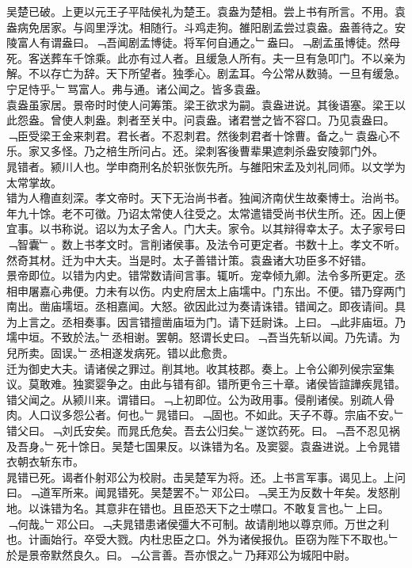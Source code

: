 \documentclass{zhvt-classic}
\begin{document}
\hspace*{2em}吴楚已破。上更以元王子平陆侯礼为楚王。袁盎为楚相。尝上书有所言。不用。袁盎病免居家。与闾里浮沈。相随行。斗鸡走狗。雒阳剧孟尝过袁盎。盎善待之。安陵富人有谓盎曰。﹁吾闻剧孟博徒。将军何自通之。﹂盎曰。﹁剧孟虽博徒。然母死。客送葬车千馀乘。此亦有过人者。且缓急人所有。夫一旦有急叩门。不以亲为解。不以存亡为辞。天下所望者。独季心。剧孟耳。今公常从数骑。一旦有缓急。宁足恃乎。﹂骂富人。弗与通。诸公闻之。皆多袁盎。\\
\hspace*{2em}袁盎虽家居。景帝时时使人问筹策。梁王欲求为嗣。袁盎进说。其後语塞。梁王以此怨盎。曾使人刺盎。刺者至关中。问袁盎。诸君誉之皆不容口。乃见袁盎曰。﹁臣受梁王金来刺君。君长者。不忍刺君。然後刺君者十馀曹。备之。﹂袁盎心不乐。家又多怪。乃之棓生所问占。还。梁刺客後曹辈果遮刺杀盎安陵郭门外。\\
\hspace*{2em}晁错者。颍川人也。学申商刑名於轵张恢先所。与雒阳宋孟及刘礼同师。以文学为太常掌故。\\
\hspace*{2em}错为人穞直刻深。孝文帝时。天下无治尚书者。独闻济南伏生故秦博士。治尚书。年九十馀。老不可徵。乃诏太常使人往受之。太常遣错受尚书伏生所。还。因上便宜事。以书称说。诏以为太子舍人。门大夫。家令。以其辩得幸太子。太子家号曰﹁智囊﹂。数上书孝文时。言削诸侯事。及法令可更定者。书数十上。孝文不听。然奇其材。迁为中大夫。当是时。太子善错计策。袁盎诸大功臣多不好错。\\
\hspace*{2em}景帝即位。以错为内史。错常数请间言事。辄听。宠幸倾九卿。法令多所更定。丞相申屠嘉心弗便。力未有以伤。内史府居太上庙壖中。门东出。不便。错乃穿两门南出。凿庙壖垣。丞相嘉闻。大怒。欲因此过为奏请诛错。错闻之。即夜请间。具为上言之。丞相奏事。因言错擅凿庙垣为门。请下廷尉诛。上曰。﹁此非庙垣。乃壖中垣。不致於法。﹂丞相谢。罢朝。怒谓长史曰。﹁吾当先斩以闻。乃先请。为兒所卖。固误。﹂丞相遂发病死。错以此愈贵。\\
\hspace*{2em}迁为御史大夫。请诸侯之罪过。削其地。收其枝郡。奏上。上令公卿列侯宗室集议。莫敢难。独窦婴争之。由此与错有卻。错所更令三十章。诸侯皆諠譁疾晁错。错父闻之。从颍川来。谓错曰。﹁上初即位。公为政用事。侵削诸侯。别疏人骨肉。人口议多怨公者。何也。﹂晁错曰。﹁固也。不如此。天子不尊。宗庙不安。﹂错父曰。﹁刘氏安矣。而晁氏危矣。吾去公归矣。﹂遂饮药死。曰。﹁吾不忍见祸及吾身。﹂死十馀日。吴楚七国果反。以诛错为名。及窦婴。袁盎进说。上令晁错衣朝衣斩东市。\\
\hspace*{2em}晁错已死。谒者仆射邓公为校尉。击吴楚军为将。还。上书言军事。谒见上。上问曰。﹁道军所来。闻晁错死。吴楚罢不。﹂邓公曰。﹁吴王为反数十年矣。发怒削地。以诛错为名。其意非在错也。且臣恐天下之士噤口。不敢复言也。﹂上曰。﹁何哉。﹂邓公曰。﹁夫晁错患诸侯彊大不可制。故请削地以尊京师。万世之利也。计画始行。卒受大戮。内杜忠臣之口。外为诸侯报仇。臣窃为陛下不取也。﹂於是景帝默然良久。曰。﹁公言善。吾亦恨之。﹂乃拜邓公为城阳中尉。\\
\end{document}
